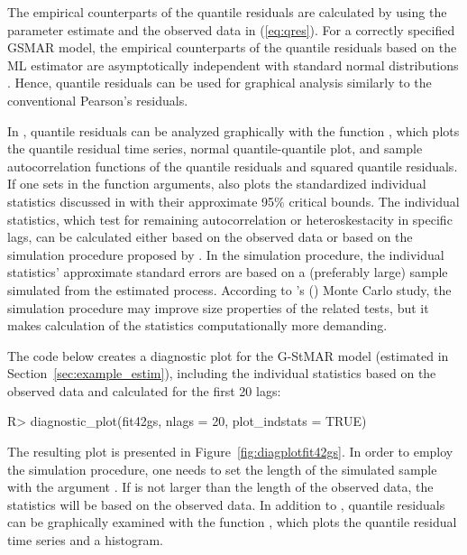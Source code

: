 \documentclass[nojss]{jss} %
\begin{document}
The empirical counterparts of the quantile residuals are calculated by using the parameter estimate and the observed data in (\ref{eq:qres}). For a correctly specified GSMAR model, the empirical counterparts of the quantile residuals based on the ML estimator are asymptotically independent with standard normal distributions \citep[Lemma 2.1]{Kalliovirta:2012}. Hence, quantile residuals can be used for graphical analysis similarly to the conventional Pearson's residuals.

In , quantile residuals can be analyzed graphically with the function , which plots the quantile residual time series, normal quantile-quantile plot, and sample autocorrelation functions of the quantile residuals and squared quantile residuals. If one sets  in the function arguments,  also plots the standardized individual statistics discussed in \citet[pp. 369-370]{Kalliovirta:2012} with their approximate 95\% critical bounds. The individual statistics, which test for remaining autocorrelation or heteroskestacity in specific lags, can be calculated either based on the observed data or based on the simulation procedure proposed by \cite{Kalliovirta:2012}. In the simulation procedure, the individual statistics' approximate standard errors are based on a (preferably large) sample simulated from the estimated process. According to \citeauthor{Kalliovirta:2012}'s (\citeyear{Kalliovirta:2012}) Monte Carlo study, the simulation procedure may improve size properties of the related tests, but it makes calculation of the statistics computationally more demanding.

The code below creates a diagnostic plot for the G-StMAR model  (estimated in Section~\ref{sec:example_estim}), including the individual statistics based on the observed data and calculated for the first 20 lags:
%
\begin{CodeChunk}
\begin{CodeInput}
R> diagnostic_plot(fit42gs, nlags = 20, plot_indstats = TRUE)
\end{CodeInput}
\end{CodeChunk}
%
The resulting plot is presented in Figure~\ref{fig:diagplotfit42gs}. In order to employ the simulation procedure, one needs to set the length of the simulated sample with the argument . If  is not larger than the length of the observed data, the statistics will be based on the observed data. In addition to , quantile residuals can be graphically examined with the function , which plots the quantile residual time series and a histogram.
\end{document}
